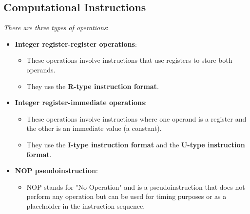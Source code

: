 \documentclass[12pt,openany]{book}
\begin{document}
\subsection{Computational Instructions}
\textit{There are three types of operations}:
\begin{itemize}
    \item \textbf{Integer register-register operations}:
    \begin{itemize}
        \item These operations involve instructions that use registers to store both operands.
        \item They use the \textbf{R-type instruction format}.
    \end{itemize}
    \item \textbf{Integer register-immediate operations}:
    \begin{itemize}
        \item These operations involve instructions where one operand is a register and the other is an immediate value (a constant).
        \item They use the \textbf{I-type instruction format} and the \textbf{U-type instruction format}.
    \end{itemize}
    \item \textbf{NOP pseudoinstruction}:
    \begin{itemize}
        \item NOP stands for "No Operation" and is a pseudoinstruction that does not perform any operation but can be used for timing purposes or as a placeholder in the instruction sequence.
    \end{itemize}
\end{itemize}
\end{document}
